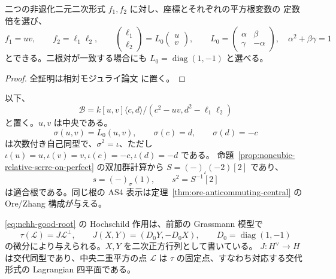 \begin{lemma}\label{lem:nchh-exchange}
二つの非退化二元二次形式 $f_1,f_2$ に対し、座標とそれぞれの平方根変数の
定数倍を選び、
\begin{equation}\label{eq:nchh-normal-forms}
f_1=uv,\qquad f_2=\ell_1\ell_2,
\qquad
\begin{pmatrix}\ell_1\\\ell_2\end{pmatrix}
=L_0\begin{pmatrix}u\\v\end{pmatrix},\qquad
L_0=\begin{pmatrix}\alpha&\beta\\\gamma&-\alpha\end{pmatrix},\quad
\alpha^2+\beta\gamma=1
\end{equation}
とできる。二根対が一致する場合にも $L_0=\operatorname{diag}(1,-1)$ と選べる。
\end{lemma}
\begin{proof}
全証明は相対モジュライ論文 \cite[\texttt{noncubic_hh_roots}]{QuadricModuli2026} に置く。
\end{proof}

以下、
\[
\mathcal B=k[u,v]\langle c,d\rangle/(c^2-uv,d^2-\ell_1\ell_2)
\]
と置く。$u,v$ は中央である。
\begin{equation}\label{eq:nchh-sigma}
\sigma(u,v)=L_0(u,v),\qquad\sigma(c)=d,\qquad\sigma(d)=-c
\end{equation}
は次数付き自己同型で、$\sigma^2=\iota$、ただし
$\iota(u)=u,\iota(v)=v,\iota(c)=-c,\iota(d)=-d$ である。
命題~\ref{prop:noncubic-relative-serre-on-perfect} の双加群計算から
$S=(-)_\iota(-2)[2]$ であり、
\begin{equation}\label{eq:nchh-good-root}
s=(-)_\sigma(1),\qquad s^2=S^{-1}[2]
\end{equation}
は適合根である。同じ根の AS4 表示は定理~\ref{thm:ore-anticommuting-central} の Ore/Zhang 構成が与える。

\begin{proposition}\label{prop:nchh-root-gale}
\eqref{eq:nchh-good-root} の Hochschild 作用は、前節の Grassmann 模型で
\begin{equation}\label{eq:nchh-involution}
\tau(\mathscr L)=J\mathscr L^{\perp},\qquad
J(X,Y)=(D_0Y,-D_0X),\qquad D_0=\operatorname{diag}(1,-1)
\end{equation}
の微分により与えられる。$X,Y$ を二次正方行列として書いている。
$J:H^{\vee}\to H$ は交代同型であり、中央二重平方の点 $\mathscr L$ は
$\tau$ の固定点、すなわち対応する交代形式の Lagrangian 四平面である。
\end{proposition}

